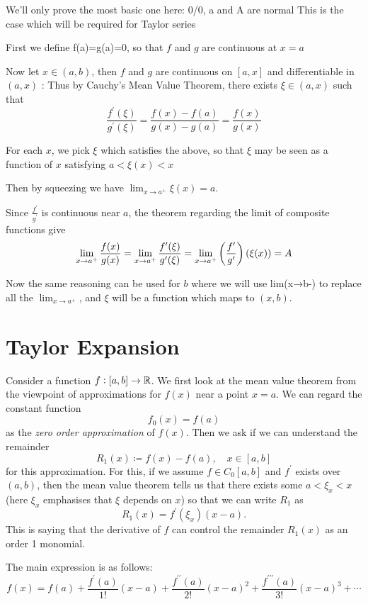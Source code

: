 We'll only prove the most basic one here:
0/0, a and A are normal
This is the case which will be required for Taylor series

First we define f(a)=g(a)=0, so that $f$ and $g$ are continuous at $x=a$

Now let $x\in(a,b)$, then $f$ and $g$ are continuous on $[a,x]$ and differentiable in $(a,x)$
:
Thus by Cauchy's Mean Value Theorem, there exists $\xi\in(a,x)$ such that
\[ \frac{f^\prime(\xi)}{g^\prime(\xi)}=\frac{f(x)-f(a)}{g(x)-g(a)}=\frac{f(x)}{g(x)} \]

For each $x$, we pick $\xi$ which satisfies the above, so that $\xi$ may be seen as a function of $x$ satisfying $a<\xi(x)<x$

Then by squeezing we have $\lim_{x\to a^+}\xi(x)=a$.

Since $\frac{f^\prime}{g^\prime}$ is continuous near $a$, the theorem regarding the limit of composite functions give
\[ \lim_{x\to a^+}\frac{f(x)}{g(x)} = \lim_{x\to a^+}\frac{f'(\xi)}{g'(\xi)} = \lim_{x\to a^+}\left(\frac{f^\prime}{g^\prime}\right)(\xi(x)) = A \]

Now the same reasoning can be used for $b$ where we will use lim(x→b-) to replace all the $\lim_{x\to a^+}$, and $\xi$ will be a function which maps to $(x,b)$.

\section{Taylor Expansion}
Consider a function $f:[a,b]\to\mathbb R$. We first look at the mean value theorem from the viewpoint of approximations for $f(x)$ near a point $x=a$. We can regard the constant function
\[ f_0(x)=f(a) \]
as the \emph{zero order approximation} of $f(x)$. Then we ask if we can understand the remainder
\[ R_1(x)\coloneqq f(x)-f(a), \quad x\in[a,b] \]
for this approximation. For this, if we assume $f\in C_0[a,b]$ and $f^\prime$ exists over $(a,b)$, then the mean value theorem tells us that there exists some $a<\xi_x<x$ (here $\xi_x$ emphasises that $\xi$ depends on $x$) so that we can write $R_1$ as
\[ R_1(x)=f^\prime(\xi_x)(x-a). \]
This is saying that the derivative of $f$ can control the remainder $R_1(x)$ as an order 1 monomial.




The main expression is as follows:
\begin{equation}
f(x)=f(a)+\frac{f^\prime(a)}{1!}(x-a)+\frac{f^{\prime\prime}(a)}{2!}(x-a)^2+\frac{f^{\prime\prime\prime}(a)}{3!}(x-a)^3+\cdots
\end{equation}

